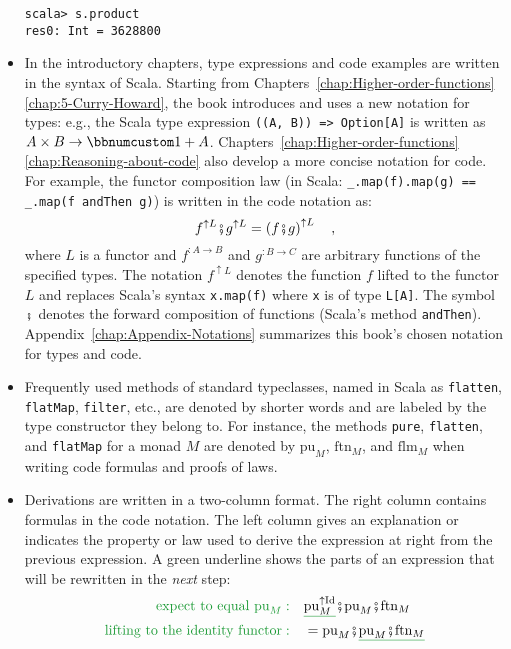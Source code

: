 \begin{itemize}
\begin{lstlisting}[mathescape=true]
scala> s.product
res0: Int = 3628800 
\end{lstlisting}
\item In the introductory chapters, type expressions and code examples are
written in the syntax of Scala. Starting from Chapters~\ref{chap:Higher-order-functions}\textendash \ref{chap:5-Curry-Howard},
the book introduces and uses a new notation for types: e.g., the Scala
type expression \lstinline!((A, B)) => Option[A]! is written as $A\times B\rightarrow\bbnum 1+A$.
Chapters~\ref{chap:Higher-order-functions}\textendash \ref{chap:Reasoning-about-code}
also develop a more concise notation for code. For example, the functor
composition law (in Scala: \lstinline!_.map(f).map(g) == _.map(f andThen g)!)
is written in the code notation as:
\[
f^{\uparrow L}\bef g^{\uparrow L}=\left(f\bef g\right)^{\uparrow L}\quad,
\]
where $L$ is a functor and $f^{:A\rightarrow B}$ and $g^{:B\rightarrow C}$
are arbitrary functions of the specified types. The notation $f^{\uparrow L}$
denotes the function $f$ lifted to the functor $L$ and replaces
Scala\textsf{'}s syntax \lstinline!x.map(f)! where \lstinline!x! is of type
\lstinline!L[A]!. The symbol $\bef$ denotes the forward composition
of functions (Scala\textsf{'}s method \lstinline!andThen!). Appendix~\ref{chap:Appendix-Notations}
summarizes this book\textsf{'}s chosen notation for types and code.
\item Frequently used methods of standard typeclasses, named in Scala as
\lstinline!flatten!, \lstinline!flatMap!, \lstinline!filter!, etc.,
are denoted by shorter words and are labeled by the type constructor
they belong to. For instance, the methods \lstinline!pure!, \lstinline!flatten!,
and \lstinline!flatMap! for a monad $M$ are denoted by $\text{pu}_{M}$,
$\text{ftn}_{M}$, and $\text{flm}_{M}$ when writing code formulas
and proofs of laws.
\item Derivations are written in a two-column format. The right column contains
formulas in the code notation. The left column gives an explanation
or indicates the property or law used to derive the expression at
right from the previous expression. A green underline shows the parts
of an expression that will be rewritten in the \emph{next} step:
\begin{align*}
{\color{greenunder}\text{expect to equal }\text{pu}_{M}:}\quad & \gunderline{\text{pu}_{M}^{\uparrow\text{Id}}}\bef\text{pu}_{M}\bef\text{ftn}_{M}\\
{\color{greenunder}\text{lifting to the identity functor}:}\quad & =\text{pu}_{M}\bef\gunderline{\text{pu}_{M}\bef\text{ftn}_{M}}\\

\end{align*}
\end{itemize}
